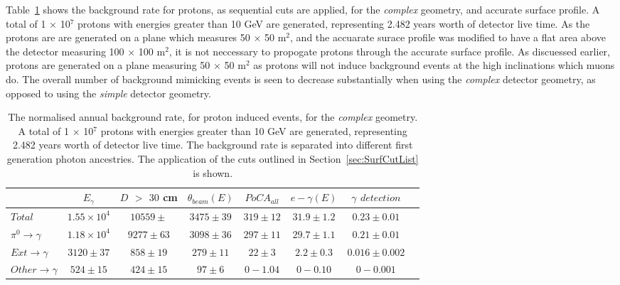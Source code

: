 Table~\ref{tab:SurfProComp} shows the background rate for protons, as sequential cuts are applied, for the \emph{complex} geometry, and accurate surface profile. A total of 1 $\times$ 10$^7$ protons with energies greater than 10 GeV are generated, representing 2.482 years worth of detector live time. As the protons are are generated on a plane which measures 50 $\times$ 50 m$^{2}$, and the accuarate surace profile was modified to have a flat area above the detector measuring 100 $\times$ 100 m$^{2}$, it is not neccessary to propogate protons through the accurate surface profile. As discuessed earlier, protons are generated on a plane measuring 50 $\times$ 50 m$^{2}$ as protons will not induce background events at the high inclinations which muons do. The overall number of background mimicking events is seen to decrease substantially when using the \emph{complex} detector geometry, as opposed to using the \emph{simple} detector geometry. \\

\begin{table}
  \caption[The normalised annual background rate, for proton induced events, for the \emph{complex} geometry]
          {The normalised annual background rate, for proton induced events, for the \emph{complex} geometry. A total of 1 $\times$ 10$^7$ protons with energies greater than 10 GeV are generated, representing 2.482 years worth of detector live time. The background rate is separated into different first generation photon ancestries. The application of the cuts outlined in Section~\ref{sec:SurfCutList} is shown.}
  \label{tab:SurfProComp}
  \centering
  \scriptsize
  \begin{tabular}{l c c c c c c c }
    \toprule
        & $E_\gamma$ &  $D$ $>$ $30$ cm & $\theta_{beam}(E)$ & $PoCA_{all}$ & $e-\gamma(E)$ & $\gamma$ $detection$ \\
        \midrule
        $Total$          & $1.55\times10^4$ & $10559\pm$  & $3475\pm39$ & $319\pm12$ & $31.9\pm1.2$ & $0.23\pm0.01$ \\

        $\pi^0\to\gamma$ & $1.18\times10^4$ & $9277\pm63$  & $3098\pm36$ & $297\pm11$ & $29.7\pm1.1$ & $0.21\pm0.01$ \\

        $Ext\to\gamma$   & $3120\pm37$      & $858\pm19$   & $279\pm11$  & $22\pm3$   & $2.2\pm0.3$  & $0.016\pm0.002$ \\

        $Other\to\gamma$ & $524\pm15$       & $424\pm15$   & $97\pm6$    & $0-1.04$   & $0-0.10$     & $0-0.001$ \\
        \bottomrule
  \end{tabular}
\end{table}


